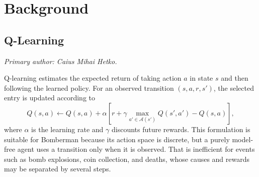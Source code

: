 \documentclass[article, 10pt]{IEEEtran}
\begin{document}


\section{Background}\label{sec:2_background}


\subsection{Q-Learning}

\textit{Primary author: Caius Mihai Hetko.}

Q-learning estimates the expected return of taking action $a$ in state $s$ and then following the learned policy. For an observed transition $(s,a,r,s')$, the selected entry is updated according to
\begin{equation}
Q(s,a) \leftarrow Q(s,a) + \alpha \left[r + \gamma \max_{a' \in \mathcal{A}(s')} Q(s',a') - Q(s,a)\right],
\end{equation}
where $\alpha$ is the learning rate and $\gamma$ discounts future rewards. This formulation is suitable for Bomberman because its action space is discrete, but a purely model-free agent uses a transition only when it is observed. That is inefficient for events such as bomb explosions, coin collection, and deaths, whose causes and rewards may be separated by several steps.
\end{document}
